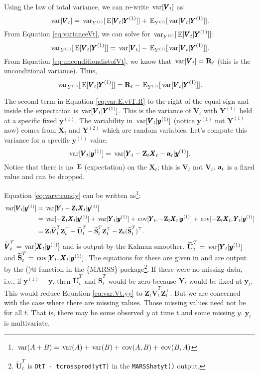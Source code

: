 \documentclass[]{article}
\def\XI{\mbox{\boldmath $\Xi$}}
\def\E{\,\textup{\textrm{E}}}
\def\RR{\mbox{$\mathbf R$}}	 \def\rr{\mbox{$\mathbf r$}} \def\Rb{\mbox{$\mathbf H$}}	\def\Rm{\mathbb{R}}
\def\Ss{\mbox{$\mathbf S$}}
\def\UU{\mbox{$\mathbf U$}}	\def\uu{\mbox{$\mathbf u$}}
\def\VV{\mbox{$\pmb{V}$}}	\def\vv{\mbox{$\pmb{v}$}}
\def\XX{\mbox{$\pmb{X}$}}	\def\xx{\mbox{$\pmb{x}$}}
\def\YY{\mbox{$\pmb{Y}$}}	\def\yy{\mbox{$\pmb{y}$}}
\def\ZZ{\mbox{$\mathbf Z$}}	\def\zz{\mbox{$\mathbf z$}}	\def\Zb{\mbox{$\mathbf M$}} \def\Za{\mbox{$\mathbf N$}} \def\Zm{\XI}
\def\var{\,\textup{\textrm{var}}}
\def\cov{\,\textup{\textrm{cov}}}
\def\hatVt{\widehat{\VV}_t}
\def\hatVtT{\widetilde{\VV}_t^T}
\def\hatUtT{\widetilde{\UU}_t^T}
\def\hatStT{\widetilde{\Ss}_t^T}
\begin{document}
Using the law of total variance, we can re-write $\var[\VV_t]$ as:
\begin{equation}\label{eq:varianceVt}
\var[\VV_t] = \var_{Y^{(1)}}[\E[\VV_t|\YY^{(1)}]] + \E_{Y^{(1)}}[\var[\VV_t|\YY^{(1)}]].
\end{equation}
From Equation \ref{eq:varianceVt}, we can solve for $\var_{Y^{(1)}}[\E[\VV_t|\YY^{(1)}]]$:
\begin{equation}\label{eq:var.E.vtT}
\var_{Y^{(1)}}[\E[\VV_t|\YY^{(1)}]] = \var[\VV_t] - \E_{Y^{(1)}}[\var[\VV_t|\YY^{(1)}]].
\end{equation}
From Equation \ref{eq:unconditiondistofVt}, we know that $\var[\VV_t]=\RR_t$ (this is the unconditional variance). Thus,
\begin{equation}\label{eq:var.E.vtT.R}
\var_{Y^{(1)}}[\E[\VV_t|\YY^{(1)}]] = \RR_t - \E_{Y^{(1)}}[\var[\VV_t|\YY^{(1)}]].
\end{equation}

The second term in Equation \ref{eq:var.E.vtT.R} to the right of the equal sign and inside the expectation is $\var[\VV_t|\YY^{(1)}]$. This is the variance of $\VV_t$ with $\YY^{(1)}$ held at a specific fixed $\yy^{(1)}$. The variability in $\var[\VV_t|\yy^{(1)}]$ (notice $\yy^{(1)}$ not $\YY^{(1)}$ now) comes from $\XX_t$ and $\YY^{(2)}$ which are random variables. Let's compute this variance for a specific $\yy^{(1)}$ value.
\begin{equation}\label{eq:varvtcondy}
\var[\VV_t|\yy^{(1)}] = \var[ \YY_t - \ZZ_t\XX_t-\aa_t | \yy^{(1)} ].
\end{equation}
Notice that there is no $\E$ (expectation) on the $\XX_t$; this is $\VV_t$ not $\hatVt$. $\aa_t$ is a fixed value and can be dropped.

Equation \ref{eq:varvtcondy} can be written as\footnote{$\var(A+B)=\var(A)+\var(B)+\cov(A,B)+\cov(B,A)$}:
\begin{equation}\label{eq:var.Vt.yy}
\begin{split}
\var[\VV_t|\yy^{(1)}] &= \var[ \YY_t - \ZZ_t\XX_t | \yy^{(1)} ]\\
&=\var[ - \ZZ_t\XX_t | \yy^{(1)} ] + \var[ \YY_t|\yy^{(1)}] + \cov[ \YY_t, - \ZZ_t\XX_t | \yy^{(1)} ] + \cov[ - \ZZ_t\XX_t, \YY_t | \yy^{(1)} ]\\
&=\ZZ_t \hatVtT \ZZ_t^\top + \hatUtT - \hatStT\ZZ_t^\top - \ZZ_t(\hatStT)^\top .
\end{split}
\end{equation}
$\hatVtT = \var[ \XX_t | \yy^{(1)} ]$ and is output by the Kalman smoother. $\hatUtT=\var[\YY_t|\yy^{(1)}]$ and $\hatStT=\cov[\YY_t,\XX_t|\yy^{(1)}]$. The equations for these are given in \citet{Holmes2010} and are output by the \verb@MARSShatyt()@ function in the \{MARSS\} package\footnote{$\hatUtT$ is  \texttt{OtT - tcrossprod(ytT)} in the \texttt{MARSShatyt()} output.}.  If there were no missing data, i.e., if $\yy^{(1)}=\yy$, then $\hatUtT$ and $\hatStT$ would be zero because $\YY_t$ would be fixed at $\yy_t$. This would reduce Equation \ref{eq:var.Vt.yy} to $\ZZ_t \hatVtT \ZZ_t^\top$. But we are concerned with the case where there are missing values. Those missing values need not be for all $t$. That is, there may be some observed $y$ at time t and some missing $y$. $\yy_t$ is multivariate.
\end{document}

